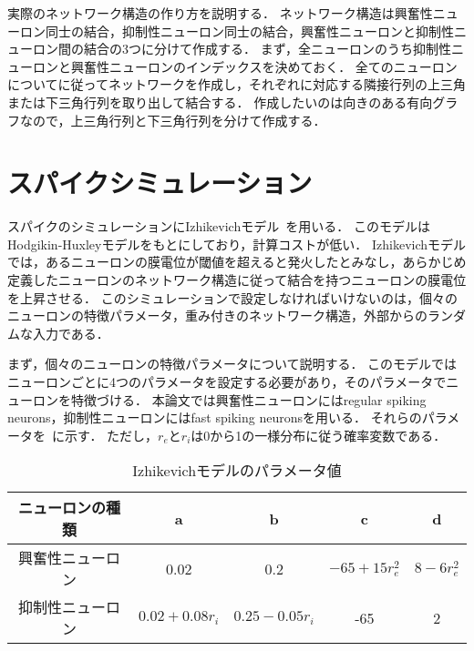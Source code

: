 実際のネットワーク構造の作り方を説明する．
ネットワーク構造は興奮性ニューロン同士の結合，抑制性ニューロン同士の結合，興奮性ニューロンと抑制性ニューロン間の結合の3つに分けて作成する．
まず，全ニューロンのうち抑制性ニューロンと興奮性ニューロンのインデックスを決めておく．
全てのニューロンについてに従ってネットワークを作成し，それぞれに対応する隣接行列の上三角または下三角行列を取り出して結合する．
作成したいのは向きのある有向グラフなので，上三角行列と下三角行列を分けて作成する．

\section{スパイクシミュレーション}
スパイクのシミュレーションにIzhikevichモデル~\cite{Izhikevich2003}を用いる．
このモデルはHodgikin-Huxleyモデルをもとにしており，計算コストが低い．
Izhikevichモデルでは，あるニューロンの膜電位が閾値を超えると発火したとみなし，あらかじめ定義したニューロンのネットワーク構造に従って結合を持つニューロンの膜電位を上昇させる．
このシミュレーションで設定しなければいけないのは，個々のニューロンの特徴パラメータ，重み付きのネットワーク構造，外部からのランダムな入力である．

まず，個々のニューロンの特徴パラメータについて説明する．
このモデルではニューロンごとに4つのパラメータを設定する必要があり，そのパラメータでニューロンを特徴づける．
本論文では興奮性ニューロンにはregular spiking neurons，抑制性ニューロンにはfast spiking neuronsを用いる．
それらのパラメータを~に示す．
ただし，$r_e$と$r_i$は0から1の一様分布に従う確率変数である．

\begin{table}[htb]
  \center
  \begin{tabular}{|c|cccc|} \hline
    ニューロンの種類 & a & b & c & d \\ \hline
    興奮性ニューロン & 0.02 & 0.2 & $-65 + 15 r_e^2$ & $8 - 6r_e^2$ \\
    抑制性ニューロン & $0.02 + 0.08r_i$ & $0.25 - 0.05 r_i$ & -65 & 2 \\ \hline
  \end{tabular}
  \caption{Izhikevichモデルのパラメータ値}
  \label{tab:parameter2}
\end{table}

